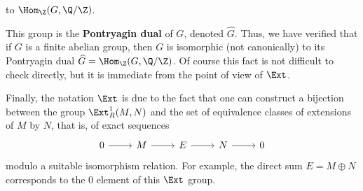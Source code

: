 to $\Hom_\Z(G,\Q/\Z)$.\par
This group is the \textbf{Pontryagin dual} of $G$, denoted $\widehat{G}$. Thus, we have verified
that if $G$ is a finite abelian group, then $G$ is isomorphic (not canonically) to its Pontryagin dual $\widehat{G}=\Hom_\Z(G,\Q/\Z)$. Of course this fact is not difficult to check directly, but it is immediate from the point of view of $\Ext$.\par
Finally, the notation $\Ext$ is due to the fact that one can construct a bijection between the group $\Ext^1_R(M,N)$ and the set of equivalence classes of extensions of $M$ by $N$, that is, of exact sequences
\[\begin{tikzcd}
0\ar[r]&M\ar[r]&E\ar[r]&N\ar[r]&0
\end{tikzcd}\]
modulo a suitable isomorphism relation. For example, the direct sum $E=M\oplus N$ corresponds to the $0$ element of this $\Ext$ group.

